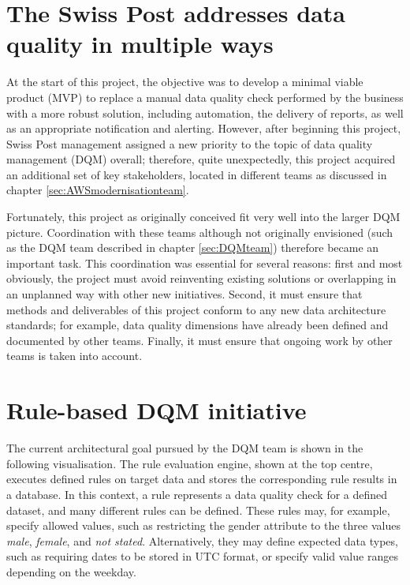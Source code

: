 
\section{The Swiss Post addresses data quality in multiple ways}
\label{SolutionMultipleTeams}
At the start of this project, the objective was to develop a minimal viable product (\gls{MVP}) to replace a manual data quality check performed by the business with a more robust solution, including automation, the delivery of reports, as well as an appropriate notification and alerting. However, after beginning this project, Swiss Post management assigned a new priority to the topic of data quality management (\gls{DQM}) overall; therefore, quite unexpectedly, this project acquired an additional set of key stakeholders, located in different teams as discussed in chapter \ref{sec:AWSmodernisationteam}. 


Fortunately, this project as originally conceived fit very well into the larger \gls{DQM} picture.  Coordination with these teams although not originally envisioned (such as the DQM team described in chapter \ref{sec:DQMteam}) therefore became an important task. This coordination was essential for several reasons: first and most obviously,  the project must avoid reinventing existing solutions or overlapping in an unplanned way with other new initiatives. Second, it must ensure that methods and deliverables of this project conform to any new data architecture standards; for example, data quality dimensions have already been defined and documented by other teams. Finally, it must ensure that ongoing work by other teams is taken into account. 



\section{Rule-based DQM initiative}
\label{DQMRuleBasedInitiative}

The current architectural goal pursued by the \gls{DQM} team is shown in the following visualisation. The rule evaluation engine, shown at the top centre, executes defined rules on target data and stores the corresponding rule results in a database. In this context, a rule represents a data quality check for a defined dataset, and many different rules can be defined. These rules may, for example, specify allowed values, such as restricting the gender attribute to the three values \textit{male}, \textit{female}, and \textit{not stated}. Alternatively, they may define expected data types, such as requiring dates to be stored in UTC format, or specify valid value ranges depending on the weekday.

